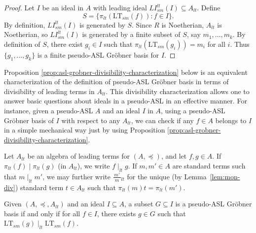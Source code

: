 \documentclass[11pt,reqno]{amsart}
\newcommand{\suchthat}{:}
\newcommand{\ltfrac}[2]{\frac{\,#1\,}{\,#2\,}{}_{{\scriptscriptstyle lt}}}
\newcommand{\divides}{\mid}
\newcommand{\ltdivides}{\mid_{lt}}
\newcommand{\gb}{Gr\"{o}bner }
\newcommand{\ltsm}{\text{LT}_{sm}}
\newcommand{\lismlt}{LI_{sm}^{lt}}
\theoremstyle{definition}
\numberwithin{equation}{section}
\begin{document}
\begin{proof}
Let $I$ be an ideal in $A$ with leading ideal $\lismlt(I) \subseteq A_{lt}$. Define
\[
S = \{\pi_{lt}(\ltsm(f)) \suchthat f \in I\}.
\]
By definition, $\lismlt(I)$ is generated by $S$. Since $R$ is Noetherian, $A_{lt}$ is Noetherian, so $\lismlt(I)$ is generated by a finite subset of $S$, say $m_1, \dotsc, m_k$. By definition of $S$, there exist $g_i \in I$ such that $\pi_{lt}(\ltsm(g_i)) = m_i$ for all $i$. Thus $\{g_1,\dotsc,g_k\}$ is a finite pseudo-ASL Gröbner basis for $I$.
\end{proof}

Proposition \ref{prop:asl-grobner-divisibility-characterization} below is an equivalent characterization of the definition of pseudo-ASL \gb basis in terms of divisibility of leading terms in $A_{lt}$. This divisibility characterization allows one to answer basic questions about ideals in a pseudo-ASL in an effective manner. For instance, given a pseudo-ASL $A$ and an ideal $I$ in $A$, using a pseudo-ASL \gb basis of $I$ with respect to any $A_{lt}$, we can check if any $f \in A$ belongs to $I$ in a simple mechanical way just by using Proposition \ref{prop:asl-grobner-divisibility-characterization}.

\begin{definition} \label{def:ltdivides}
Let $A_{lt}$ be an algebra of leading terms for $(A,\preceq)$, and let $f, g \in A$. If $\pi_{lt}(f) \divides \pi_{lt}(g)$ (in $A_{lt}$), we write $f \ltdivides g$. If $m,m' \in A$ are standard terms such that $m \ltdivides m'$, we may further write $\ltfrac{m'}{m}$ for the unique (by Lemma~\ref{lem:mon-div}) standard term $t \in A_{lt}$ such that $\pi_{lt}(m)t = \pi_{lt}(m')$. 
\end{definition}

\begin{proposition}[store=propaslgrob-divcharacterization, note={Divisibility characterization of pseudo-ASL Gröbner bases}]
\label{prop:asl-grobner-divisibility-characterization}
Given $(A, \preceq, A_{lt})$ and an ideal $I \subseteq A$, a subset $G \subseteq I$ is a pseudo-ASL Gröbner basis if and only if for all $f \in I$, there exists $g \in G$ such that $\ltsm(g) \ltdivides \ltsm(f)$.
\end{proposition}
\end{document}
